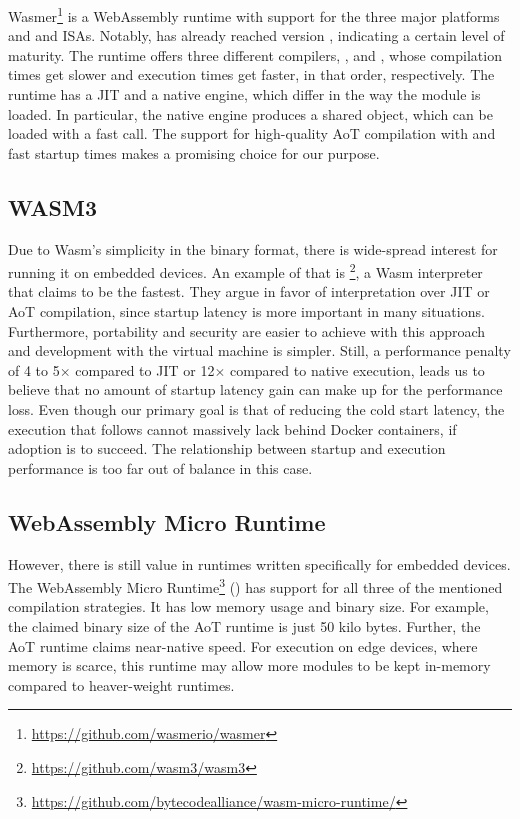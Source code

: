 Wasmer\footnote{\url{https://github.com/wasmerio/wasmer}} is a WebAssembly runtime with support for the three major platforms and  and  ISAs. Notably,  has already reached version , indicating a certain level of maturity. The runtime offers three different compilers, ,  and , whose compilation times get slower and execution times get faster, in that order, respectively. The runtime has a JIT and a native engine, which differ in the way the module is loaded. In particular, the native engine produces a shared object, which can be loaded with a fast  call. The support for high-quality AoT compilation with  and fast startup times makes  a promising choice for our purpose.

\subsection{WASM3}

Due to Wasm's simplicity in the binary format, there is wide-spread interest for running it on embedded devices. An example of that is \footnote{\url{https://github.com/wasm3/wasm3}}, a Wasm interpreter that claims to be the fastest. They argue in favor of interpretation over JIT or AoT compilation, since startup latency is more important in many situations. Furthermore, portability and security are easier to achieve with this approach and development with the virtual machine is simpler. Still, a performance penalty of 4 to 5$\times$ compared to JIT or 12$\times$ compared to native execution, leads us to believe that no amount of startup latency gain can make up for the performance loss. Even though our primary goal is that of reducing the cold start latency, the execution that follows cannot massively lack behind Docker containers, if adoption is to succeed. The relationship between startup and execution performance is too far out of balance in this case.

\subsection{WebAssembly Micro Runtime}

However, there is still value in runtimes written specifically for embedded devices. The WebAssembly Micro Runtime\footnote{\url{https://github.com/bytecodealliance/wasm-micro-runtime/}} () has support for all three of the mentioned compilation strategies. It has low memory usage and binary size. For example, the claimed binary size of the AoT runtime is just 50 kilo bytes. Further, the AoT runtime claims near-native speed. For execution on edge devices, where memory is scarce, this runtime may allow more modules to be kept in-memory compared to heaver-weight runtimes.

